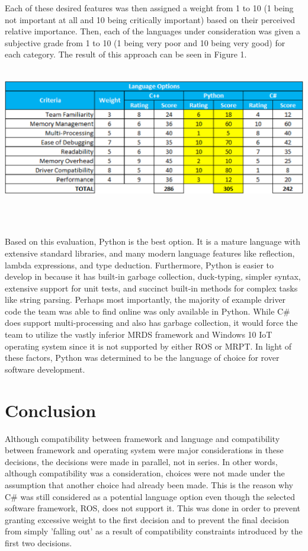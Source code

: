 \documentclass[onecolumn, draftclsnofoot,10pt, compsoc]{IEEEtran}
\begin{document}
\par Each of these desired features was then assigned a weight from 1 to 10 (1 being not important at all and 10 being critically important) based on their perceived relative importance. Then, each of the languages under consideration was given a subjective grade from 1 to 10 (1 being very poor and 10 being very good) for each category. The result of this approach can be seen in Figure 1.\\ \\
\begin{minipage}{\linewidth}
\begin{center}
\includegraphics[width=\textwidth]{table.eps}
\end{center}
\end{minipage}\\ \\
\par Based on this evaluation, Python is the best option. It is a mature language with extensive standard libraries, and many modern language features like reflection, lambda expressions, and type deduction. Furthermore, Python is easier to develop in because it has built-in garbage collection, duck-typing, simpler syntax, extensive support for unit tests, and succinct built-in methods for complex tasks like string parsing. Perhaps most importantly, the majority of example driver code the team was able to find online was only available in Python. While C\# does support multi-processing and also has garbage collection, it would force the team to utilize the vastly inferior MRDS framework and Windows 10 IoT operating system since it is not supported by either ROS or MRPT. In light of these factors, Python was determined to be the language of choice for rover software development. 
\section{Conclusion}
Although compatibility between framework and language and compatibility between framework and operating system were major considerations in these decisions, the decisions were made in parallel, not in series. In other words, although compatibility was a consideration, choices were not made under the assumption that another choice had already been made. This is the reason why C\# was still considered as a potential language option even though the selected software framework, ROS, does not support it. This was done in order to prevent granting excessive weight to the first decision and to prevent the final decision from simply 'falling out' as a result of compatibility constraints introduced by the first two decisions.
\end{document}
